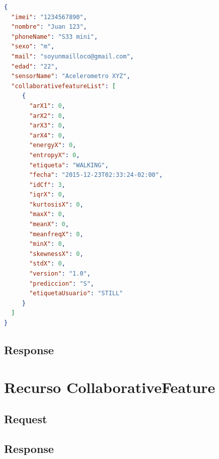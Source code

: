 \begin{lstlisting}[language=json,firstnumber=1]
{
  "imei": "1234567890",
  "nombre": "Juan 123",
  "phoneName": "S33 mini",
  "sexo": "m",
  "mail": "soyunmailloco@gmail.com",
  "edad": "22",
  "sensorName": "Acelerometro XYZ",
  "collaborativefeatureList": [
     {
       "arX1": 0,
       "arX2": 0,
       "arX3": 0,
       "arX4": 0,
       "energyX": 0,
       "entropyX": 0,
       "etiqueta": "WALKING",
       "fecha": "2015-12-23T02:33:24-02:00",
       "idCf": 3,
       "iqrX": 0,
       "kurtosisX": 0,
       "maxX": 0,
       "meanX": 0,
       "meanfreqX": 0,
       "minX": 0,
       "skewnessX": 0,
       "stdX": 0,
       "version": "1.0",
       "prediccion": "S",
       "etiquetaUsuario": "STILL"
     }
  ]
}
\end{lstlisting}

\subsection{Response}

\section{Recurso CollaborativeFeature}

\subsection{Request}

\subsection{Response}